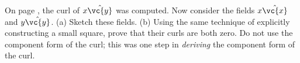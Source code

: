 On page \pageref{curlxy}, the curl of $x\hat{\vc{y}}$ was computed.
        Now consider the fields $x\hat{\vc{x}}$ and $y\hat{\vc{y}}$.\hwendpart
        (a) Sketch these fields.\hwendpart
        (b) Using the same technique of explicitly constructing a small square,
        prove that their curls are both zero.
        Do not use the component form of the curl; this was one step in \emph{deriving}
        the component form of the curl.
